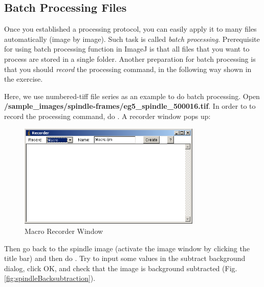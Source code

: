 \subsection{Batch Processing Files}

Once you established a processing protocol, you can easily apply it to many files automatically (image by image). Such task is
called \textit{batch processing}.
Prerequisite for using batch processing function in ImageJ is that all
files that you want to process are stored in a single folder. Another
preparation for batch processing is that you should
\textit{record} the processing command,
in the following way shown in the exercise.



\begin{indentexercise}{1}
Here, we use numbered-tiff file series as an example to do batch
processing. Open
\textbf{/sample\_images/spindle-frames/eg5\_spindle\_500016.tif}. In order to
to record the processing command, do . A recorder window pops up:

\begin{figure}[htbp]
\begin{center}
\includegraphics[width=8.678cm,height=4.942cm]{fig/CMCIBasicCourse201102-img70.png}
\caption{ Macro Recorder Window}
\label{fig:img70}
\end{center}
\end{figure}


Then go back to the spindle image (activate the image window by clicking
the title bar) and then do . Try to input some values in the subtract background dialog, click OK, and check that the image is background subtracted (Fig. \ref{fig:spindleBacksubtraction}). 



\end{indentexercise}
